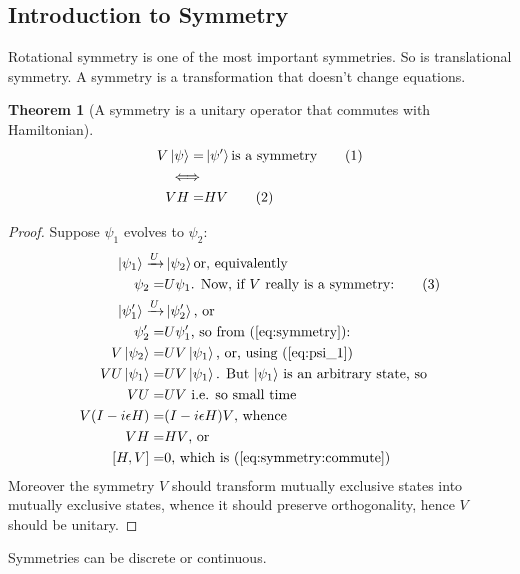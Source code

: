 \documentclass[]{article}
\newcommand\numberthis{\addtocounter{equation}{1}\tag{\theequation}}
\newtheorem{thm}{Theorem}
\begin{document}
\subsection{Introduction to Symmetry}

Rotational symmetry is one of the most important symmetries. So is translational symmetry. A symmetry is a transformation  that doesn't change equations.

\begin{thm}[A symmetry is a unitary operator that commutes with Hamiltonian]
	\begin{align*}
	V \ket{\psi} =& \ket{\psi^{\prime}} \text{is a symmetry}\numberthis \label{eq:symmetry}\\
	\iff&\\
	V H =& H V\numberthis \label{eq:symmetry:commute}
	\end{align*}
\end{thm}

\begin{proof}
	Suppose $\psi_1$ evolves to $\psi_2$:
	\begin{align*}
	\ket{\psi_1} \xrightarrow{U}& \ket{\psi_2} \text {or, equivalently}\\
	\psi_2 =& U \psi_1 \text{. Now, if $V$ really is a symmetry:} \numberthis \label{eq:psi_1}\\
	\ket{\psi_1^{\prime}} \xrightarrow{U}& \ket{\psi_2^{\prime}} \text {,  or}\\
	\psi_2^{\prime} =& U \psi_1^{\prime} \text{, so from (\ref{eq:symmetry}):}\\
	V\ket{\psi_2} =& U V \ket{\psi_1} \text{, or, using (\ref{eq:psi_1})}\\
	V U\ket {\psi_1} =& U V \ket{\psi_1} \text{. But $\ket{\psi_1}$ is an arbitrary state, so} \\
	V U =& U V \text{ i.e. so small time}\\
	V (I - i \epsilon H) =& (I - i \epsilon H) V \text{, whence}\\
	V H =& H V \text{, or}\\
	[H,V] =& 0 \text{, which is (\ref{eq:symmetry:commute})}
	\end{align*}
	Moreover the symmetry $V$ should transform mutually exclusive states into mutually exclusive states, whence it should preserve orthogonality, hence $V$ should be unitary. 
\end{proof}



Symmetries can be discrete or continuous.
\end{document}

